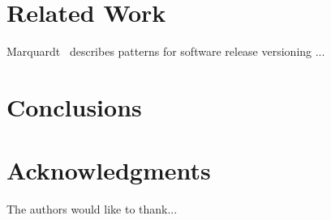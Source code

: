 \documentclass[conference]{IEEEtran}
\begin{document}
\section{Related Work}

Marquardt~\cite{Marquardt2010:EuroPLoP} describes patterns for software release versioning ...


\section{Conclusions}


\section*{Acknowledgments}

The authors would like to thank...

%

\end{document}
